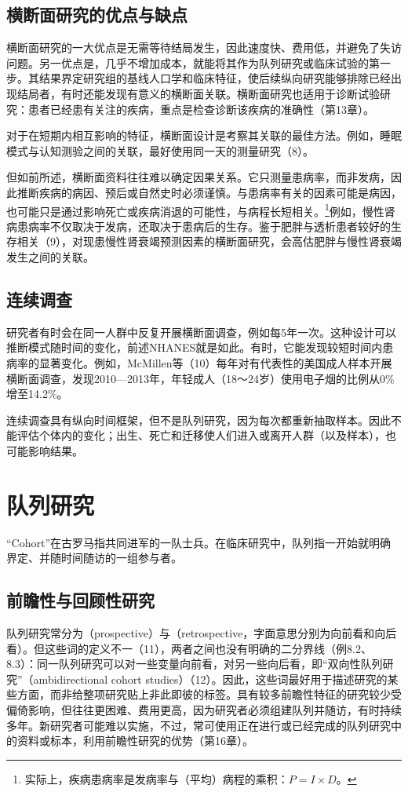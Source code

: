 \subsection{横断面研究的优点与缺点}
横断面研究的一大优点是无需等待结局发生，因此速度快、费用低，并避免了失访问题。另一优点是，几乎不增加成本，就能将其作为队列研究或临床试验的第一步。其结果界定研究组的基线人口学和临床特征，使后续纵向研究能够排除已经出现结局者，有时还能发现有意义的横断面关联。横断面研究也适用于诊断试验研究：患者已经患有关注的疾病，重点是检查诊断该疾病的准确性（第13章）。

对于在短期内相互影响的特征，横断面设计是考察其关联的最佳方法。例如，睡眠模式与认知测验之间的关联，最好使用同一天的测量研究（8）。

但如前所述，横断面资料往往难以确定因果关系。它只测量患病率，而非发病，因此推断疾病的病因、预后或自然史时必须谨慎。与患病率有关的因素可能是病因，也可能只是通过影响死亡或疾病消退的可能性，与病程长短相关。\footnote{实际上，疾病患病率是发病率与（平均）病程的乘积：$P=I\times D$。}例如，慢性肾病患病率不仅取决于发病，还取决于患病后的生存。鉴于肥胖与透析患者较好的生存相关（9），对现患慢性肾衰竭预测因素的横断面研究，会高估肥胖与慢性肾衰竭发生之间的关联。

\subsection{连续调查}
研究者有时会在同一人群中反复开展横断面调查，例如每5年一次。这种设计可以推断模式随时间的变化，前述NHANES就是如此。有时，它能发现较短时间内患病率的显著变化。例如，McMillen等（10）每年对有代表性的美国成人样本开展横断面调查，发现2010—2013年，年轻成人（18～24岁）使用电子烟的比例从0\%增至14.2\%。

连续调查具有纵向时间框架，但不是队列研究，因为每次都重新抽取样本。因此不能评估个体内的变化；出生、死亡和迁移使人们进入或离开人群（以及样本），也可能影响结果。

\section{队列研究}
“Cohort”在古罗马指共同进军的一队士兵。在临床研究中，队列指一开始就明确界定、并随时间随访的一组参与者。

\subsection{前瞻性与回顾性研究}
队列研究常分为（prospective）与（retrospective，字面意思分别为向前看和向后看）。但这些词的定义不一（11），两者之间也没有明确的二分界线（例8.2、8.3）：同一队列研究可以对一些变量向前看，对另一些向后看，即“双向性队列研究”（ambidirectional cohort studies）（12）。因此，这些词最好用于描述研究的某些方面，而非给整项研究贴上非此即彼的标签。具有较多前瞻性特征的研究较少受偏倚影响，但往往更困难、费用更高，因为研究者必须组建队列并随访，有时持续多年。新研究者可能难以实施，不过，常可使用正在进行或已经完成的队列研究中的资料或标本，利用前瞻性研究的优势（第16章）。

